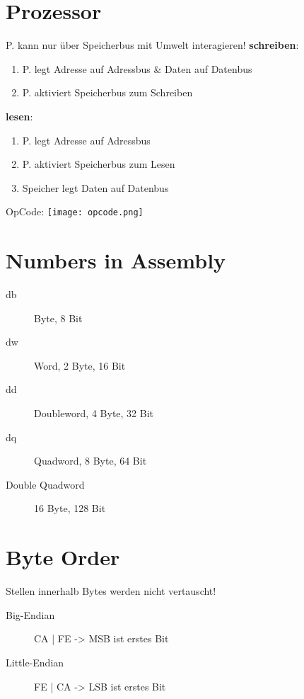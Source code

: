 

\newcommand{\TITLE}{Betriebssysteme 1}
\newcommand{\AUTHOR}{Mona Panchaud}
\newcommand{\INSTITUTE}{Ostschweizer Fachhochschule}

\begin{multicols*}{4}

\section{Prozessor}
P. kann nur über Speicherbus mit Umwelt interagieren!
\textbf{schreiben}:
\begin{enumerate}
    \item P. legt Adresse auf Adressbus \& Daten auf Datenbus
    \item P. aktiviert Speicherbus zum Schreiben
\end{enumerate}
\textbf{lesen}:
\begin{enumerate}
    \item P. legt Adresse auf Adressbus
    \item P. aktiviert Speicherbus zum Lesen
    \item Speicher legt Daten auf Datenbus
\end{enumerate}
OpCode: \texttt{[image: opcode.png]}

\section{Numbers in Assembly}
\begin{description}
    \item[db] Byte, 8 Bit
    \item[dw] Word, 2 Byte, 16 Bit
    \item[dd] Doubleword, 4 Byte, 32 Bit
    \item[dq] Quadword, 8 Byte, 64 Bit
    \item [Double Quadword] 16 Byte, 128 Bit
\end{description}

\section{Byte Order}
Stellen innerhalb Bytes werden nicht vertauscht!
\begin{description}
    \item[Big-Endian] CA | FE -> MSB ist erstes Bit
    \item[Little-Endian] FE | CA -> LSB ist erstes Bit
\end{description}


\end{multicols*}
